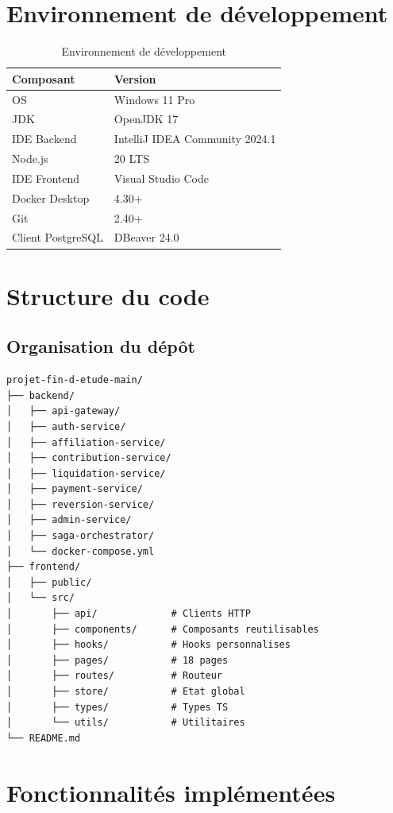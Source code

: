 \documentclass[12pt,a4paper,oneside]{report}
\begin{document}
\section{Environnement de développement}
\begin{table}[H]
\centering
\caption{Environnement de développement}
\begin{tabular}{ll}
\toprule
\textbf{Composant} & \textbf{Version} \\
\midrule
OS & Windows 11 Pro \\
JDK & OpenJDK 17 \\
IDE Backend & IntelliJ IDEA Community 2024.1 \\
Node.js & 20 LTS \\
IDE Frontend & Visual Studio Code \\
Docker Desktop & 4.30+ \\
Git & 2.40+ \\
Client PostgreSQL & DBeaver 24.0 \\
\bottomrule
\end{tabular}
\end{table}

\section{Structure du code}

\subsection{Organisation du dépôt}
\begin{lstlisting}[caption={Structure du depot}]
projet-fin-d-etude-main/
├── backend/
│   ├── api-gateway/
│   ├── auth-service/
│   ├── affiliation-service/
│   ├── contribution-service/
│   ├── liquidation-service/
│   ├── payment-service/
│   ├── reversion-service/
│   ├── admin-service/
│   ├── saga-orchestrator/
│   └── docker-compose.yml
├── frontend/
│   ├── public/
│   └── src/
│       ├── api/             # Clients HTTP
│       ├── components/      # Composants reutilisables
│       ├── hooks/           # Hooks personnalises
│       ├── pages/           # 18 pages
│       ├── routes/          # Routeur
│       ├── store/           # Etat global
│       ├── types/           # Types TS
│       └── utils/           # Utilitaires
└── README.md
\end{lstlisting}

\section{Fonctionnalités implémentées}
\end{document}
